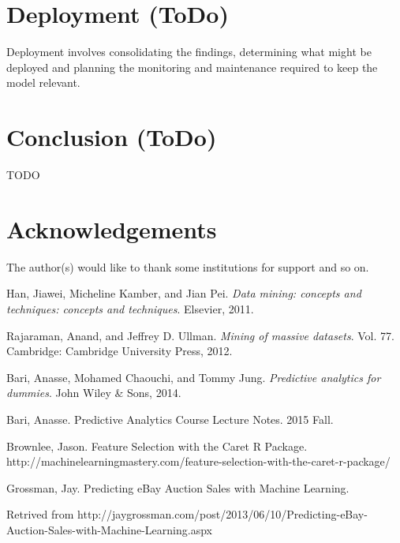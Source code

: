 \documentclass[CEJM,PDF]{cej} %
\begin{document}
\section{Deployment (ToDo)}
Deployment involves consolidating the findings, determining what might be deployed and planning the monitoring and maintenance required to keep the model relevant.

\section{Conclusion (ToDo)}
TODO


\section*{Acknowledgements}

The author(s) would like to thank some institutions for support and so on.


\begin{thebibliography}{9}

Han, Jiawei, Micheline Kamber, and Jian Pei.\textit{ Data mining: concepts and techniques: concepts and techniques}. Elsevier, 2011.

 Rajaraman, Anand, and Jeffrey D. Ullman. \textit{Mining of massive datasets}. Vol. 77. Cambridge: Cambridge University Press, 2012.

 Bari, Anasse, Mohamed Chaouchi, and Tommy Jung. \textit{Predictive analytics for dummies}. John Wiley \& Sons, 2014.	

 Bari, Anasse. Predictive Analytics Course Lecture Notes. 2015 Fall.

  Brownlee, Jason. Feature Selection with the Caret R Package. http://machinelearningmastery.com/feature-selection-with-the-caret-r-package/

 Grossman, Jay. Predicting eBay Auction Sales with Machine Learning.

Retrived from http://jaygrossman.com/post/2013/06/10/Predicting-eBay-Auction-Sales-with-Machine-Learning.aspx


\end{thebibliography}
\end{document}
